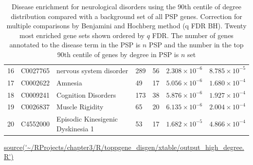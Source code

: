 \begin{table}[ht]
\begin{adjustbox}{width=\textwidth}
\begin{tabular}{lllllll}
  16 & C0027765 & nervous system disorder & 289 & 56 & $2.308 \times 10^{-6}$ & $8.785 \times 10^{-5}$ \\ 
  17 & C0002622 & Amnesia & 49 & 17 & $5.056 \times 10^{-6}$ & $1.680 \times 10^{-4}$ \\ 
  18 & C0009241 & Cognition Disorders & 173 & 38 & $5.876 \times 10^{-6}$ & $1.927 \times 10^{-4}$ \\ 
  19 & C0026837 & Muscle Rigidity & 65 & 20 & $6.135 \times 10^{-6}$ & $2.004 \times 10^{-4}$ \\ 
  20 & C4552000 & Episodic Kinesigenic Dyskinesia 1 & 53 & 17 & $1.682 \times 10^{-5}$ & $4.866 \times 10^{-4}$ \\ 
   \bottomrule
\end{tabular}
\end{adjustbox}
\caption{Disease enrichment for neurological disorders using the 90th centile of degree distribution compared with a background set of all PSP genes. Correction for multiple comparisons by Benjamini and Hochberg method (q FDR BH). Twenty most enriched gene sets shown ordered by $q$ FDR. The number of genes annotated to the disease term in the PSP is $n$ PSP and the number in the top 90th centile of genes by degree in PSP is $n$ set } 
\tiny\url{source('~/RProjects/chapter3/R/toppgene_disgen/xtable/output_high_degree.R')}

\end{table}

